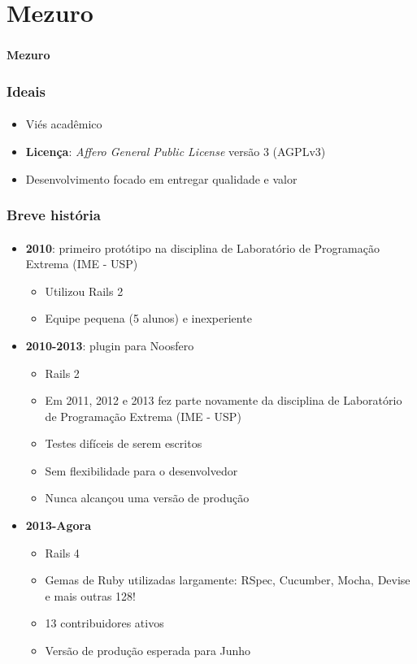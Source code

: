\documentclass{beamer}
\begin{document}
\section{Mezuro}
\begin{frame}
  \frametitle{}
  \framesubtitle{}

  \LARGE{\textbf{Mezuro}}
\end{frame}

\begin{frame}
  \frametitle{Ideais}
  \framesubtitle{}

  \begin{itemize}
    \item Viés acadêmico
    \item \textbf{Licença}: \textit{Affero General Public License} versão 3 (AGPLv3)
    \item Desenvolvimento focado em entregar qualidade e valor
  \end{itemize}
\end{frame}

\begin{frame}
  \frametitle{Breve história}
  \framesubtitle{}

  \begin{itemize}
    \item \textbf{2010}: primeiro protótipo na disciplina de Laboratório de Programação Extrema (IME - USP)
      \begin{itemize}
        \item Utilizou Rails 2
        \item Equipe pequena (5 alunos) e inexperiente
      \end{itemize}
    \item \textbf{2010-2013}: plugin para Noosfero
      \begin{itemize}
        \item Rails 2
        \item Em 2011, 2012 e 2013 fez parte novamente da disciplina de Laboratório de Programação Extrema (IME - USP)
        \item Testes difíceis de serem escritos
        \item Sem flexibilidade para o desenvolvedor
        \item Nunca alcançou uma versão de produção
      \end{itemize}
    \item \textbf{2013-Agora}
      \begin{itemize}
        \item Rails 4
        \item Gemas de Ruby utilizadas largamente: RSpec, Cucumber, Mocha, Devise e mais outras 128!
        \item 13 contribuidores ativos
        \item Versão de produção esperada para Junho
      \end{itemize}
  \end{itemize}
\end{frame}
\end{document}
